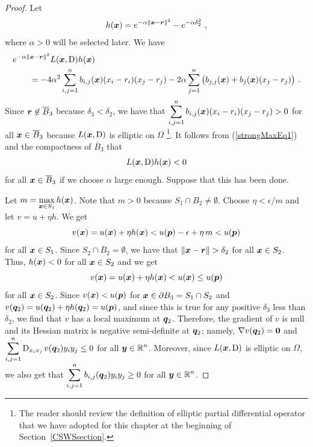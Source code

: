 \begin{proof}
Let
\begin{equation} \label{strongMaxEq4}
  h({\bm{x}}) = e^{-\alpha \|{\bm{x}} - {\bm{r}}\|^2} - e^{-\alpha \delta_2^2} \ ,
\end{equation}
where $\alpha>0$ will be selected later.  We have
\begin{equation} \label{strongMaxEq1}
\begin{split}
&e^{-\alpha \|{\bm{x}} - {\bm{r}}\|^2} L({\bm{x}},\operatorname{D}) h ({\bm{x}}) \\
&\qquad = - 4 \alpha^2 \sum_{i,j=1}^n b_{i,j}({\bm{x}}) (x_i - r_i)(x_j - r_j)
- 2 \alpha \sum_{j=1}^n \big(b_{j,j}({\bm{x}}) + b_j({\bm{x}}) (x_j - r_j)\big) \ .
\end{split}
\end{equation}
Since ${\bm{r}} \not\in \overline{B}_3$ because $\delta_3 < \delta_2$, we
have that
$\displaystyle \sum_{i,j=1}^n b_{i,j}({\bm{x}}) (x_i - r_i)(x_j - r_j) > 0$
for all ${\bm{x}} \in \overline{B}_3$ because
$L({\bm{x}},\operatorname{D})$ is elliptic on $\Omega$ \footnote{The reader should
review the definition of elliptic partial differential operator
that we have adopted for this chapter at the beginning of
Section~\ref{CSWSsection}.}.  It follows from
(\ref{strongMaxEq1}) and the compactness of $\overline{B}_3$ that 
\begin{equation} \label{strongMaxEq2}
  L({\bm{x}},\operatorname{D}) h ({\bm{x}})  < 0
\end{equation}
for all ${\bm{x}} \in \overline{B}_3$ if we choose $\alpha$ large
enough.  Suppose that this has been done.

Let $\displaystyle m = \max_{{\bm{x}} \in S_1} h({\bm{x}})$.  Note that
$m>0$ because $S_1 \cap B_2 \neq \emptyset$.
Choose $\eta < \epsilon/m$ and let $v = u + \eta h$.
We get
\[
v({\bm{x}}) = u({\bm{x}}) + \eta h({\bm{x}})
< u({\bm{p}}) - \epsilon + \eta\, m < u({\bm{p}})
\]
for all ${\bm{x}} \in S_1$.  Since $S_2 \cap \overline{B}_2 = \emptyset$,
we have that $\|\VEC{x} - \VEC{r}\|>\delta_2$ for all
${\bm{x}} \in S_2$.  Thus, $h({\bm{x}}) < 0$ for all ${\bm{x}} \in S_2$ and
we get
\[
v({\bm{x}}) = u({\bm{x}}) + \eta h({\bm{x}}) < u({\bm{x}}) \leq u({\bm{p}})
\]
for all ${\bm{x}} \in S_2$.  Since $v({\bm{x}}) < u({\bm{p}})$ for
${\bm{x}} \in \partial B_3 = S_1 \cap S_2$ and
$v({\bm{q}}_2) = u({\bm{q}}_2) + \eta h({\bm{q}}_2) = u({\bm{p}})$, and
since this is true for any positive $\delta_3$ less than $\delta_2$,
we find that $v$ has a local maximum at ${\bm{q}}_2$.  Therefore,
the gradient of $v$ is null and its Hessian matrix is negative
semi-definite at ${\bm{q}}_2$; namely, $\nabla v({\bm{q}}_2) = {\bm{0}}$ and 
$\displaystyle \sum_{i,j=1}^n \operatorname{D}_{x_i x_j} v({\bm{q}}_2) y_i y_j \leq 0$
for all $\displaystyle {\bm{y}} \in \mathbb{R}^n$.  Moreover, since
$L({\bm{x}},\operatorname{D})$ is elliptic on $\Omega$, we also get that
$\displaystyle \sum_{i,j=1}^n b_{i,j}({\bm{q}}_2) y_i y_j \geq 0$
for all $\displaystyle {\bm{y}} \in \mathbb{R}^n$.


\end{proof}
